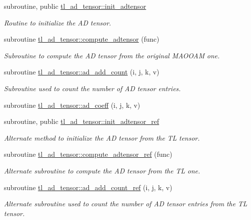 \begin{DoxyCompactItemize}
subroutine, public \hyperlink{namespacetl__ad__tensor_a199cc07a7172f6cf662f9a5bd6f3d45c}{tl\+\_\+ad\+\_\+tensor\+::init\+\_\+adtensor}
\begin{DoxyCompactList}\small\item\em Routine to initialize the AD tensor. \end{DoxyCompactList}\item 
subroutine \hyperlink{namespacetl__ad__tensor_a9437eafe79ee3b0b89cd67af4956fba0}{tl\+\_\+ad\+\_\+tensor\+::compute\+\_\+adtensor} (func)
\begin{DoxyCompactList}\small\item\em Subroutine to compute the AD tensor from the original M\+A\+O\+O\+AM one. \end{DoxyCompactList}\item 
subroutine \hyperlink{namespacetl__ad__tensor_a0ba0f9d4f9182a49209483749b6d5e10}{tl\+\_\+ad\+\_\+tensor\+::ad\+\_\+add\+\_\+count} (i, j, k, v)
\begin{DoxyCompactList}\small\item\em Subroutine used to count the number of AD tensor entries. \end{DoxyCompactList}\item 
subroutine \hyperlink{namespacetl__ad__tensor_a177e8f1ebac5de029f565ef7624926f2}{tl\+\_\+ad\+\_\+tensor\+::ad\+\_\+coeff} (i, j, k, v)
\item 
subroutine, public \hyperlink{namespacetl__ad__tensor_a3b666898a684bf3f2e932f38616fc920}{tl\+\_\+ad\+\_\+tensor\+::init\+\_\+adtensor\+\_\+ref}
\begin{DoxyCompactList}\small\item\em Alternate method to initialize the AD tensor from the TL tensor. \end{DoxyCompactList}\item 
subroutine \hyperlink{namespacetl__ad__tensor_a154e946ce2d6720a48a675ba92a7f350}{tl\+\_\+ad\+\_\+tensor\+::compute\+\_\+adtensor\+\_\+ref} (func)
\begin{DoxyCompactList}\small\item\em Alternate subroutine to compute the AD tensor from the TL one. \end{DoxyCompactList}\item 
subroutine \hyperlink{namespacetl__ad__tensor_a3c0b4e0e1f18a0f85b874542b76cfa8a}{tl\+\_\+ad\+\_\+tensor\+::ad\+\_\+add\+\_\+count\+\_\+ref} (i, j, k, v)
\begin{DoxyCompactList}\small\item\em Alternate subroutine used to count the number of AD tensor entries from the TL tensor. \end{DoxyCompactList}\item 

\end{DoxyCompactItemize}

